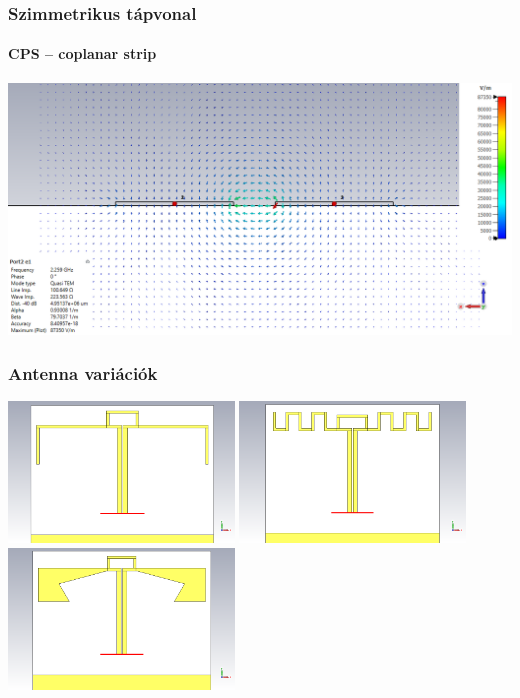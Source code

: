 \documentclass[aspectratio=43]{beamer}
\begin{document}
\begin{frame}
	\frametitle{Szimmetrikus tápvonal}
	\framesubtitle{CPS -- coplanar strip}
	\centering
	\includegraphics[width=\textwidth]{e1_2.png}
\end{frame}
\begin{frame}
	\frametitle{Antenna variációk}
		\centering
		\includegraphics[width=0.45\textwidth]{bifa_3D.png}
		\includegraphics[width=0.45\textwidth]{bifa_meandered_3D.png}
		\includegraphics[width=0.45\textwidth]{bifa_broadband_3D.png}
\end{frame}
\end{document}
